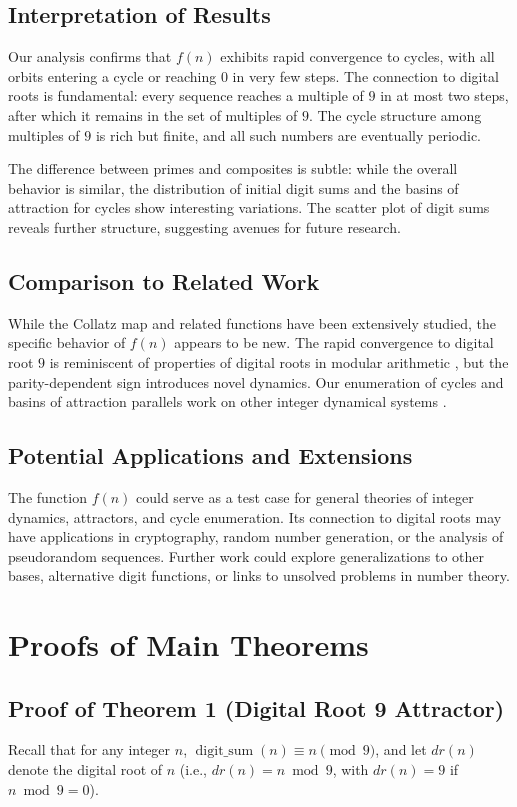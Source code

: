 \documentclass[12pt]{article}
\begin{document}
\subsection{Interpretation of Results}
Our analysis confirms that $f(n)$ exhibits rapid convergence to cycles, with all orbits entering a cycle or reaching $0$ in very few steps. The connection to digital roots is fundamental: every sequence reaches a multiple of $9$ in at most two steps, after which it remains in the set of multiples of $9$. The cycle structure among multiples of $9$ is rich but finite, and all such numbers are eventually periodic.

The difference between primes and composites is subtle: while the overall behavior is similar, the distribution of initial digit sums and the basins of attraction for cycles show interesting variations. The scatter plot of digit sums reveals further structure, suggesting avenues for future research.

\subsection{Comparison to Related Work}
While the Collatz map and related functions have been extensively studied, the specific behavior of $f(n)$ appears to be new. The rapid convergence to digital root $9$ is reminiscent of properties of digital roots in modular arithmetic \cite{guy2004unsolved, allouche2003automatic}, but the parity-dependent sign introduces novel dynamics. Our enumeration of cycles and basins of attraction parallels work on other integer dynamical systems \cite{lagarias2010collatz, wirsching1998dynamical}.

\subsection{Potential Applications and Extensions}
The function $f(n)$ could serve as a test case for general theories of integer dynamics, attractors, and cycle enumeration. Its connection to digital roots may have applications in cryptography, random number generation, or the analysis of pseudorandom sequences. Further work could explore generalizations to other bases, alternative digit functions, or links to unsolved problems in number theory.

\section{Proofs of Main Theorems}
\label{sec:proofs}
\subsection{Proof of Theorem 1 (Digital Root 9 Attractor)}
Recall that for any integer $n$, $\operatorname{digit\_sum}(n) \equiv n \pmod{9}$, and let $dr(n)$ denote the digital root of $n$ (i.e., $dr(n) = n \bmod 9$, with $dr(n) = 9$ if $n \bmod 9 = 0$).
\end{document}

